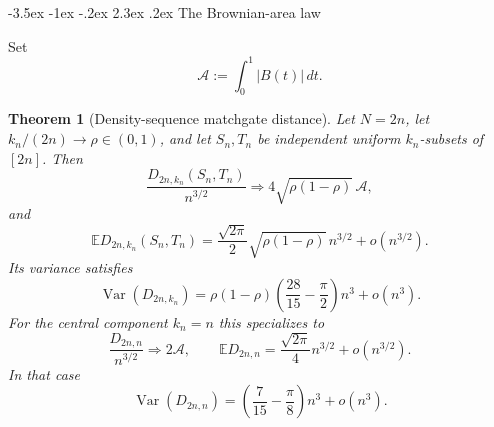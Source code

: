 \documentclass[twoside,10pt]{article}
\makeatletter
\numberwithin{equation}{section}
\theoremstyle{slbody}
\newtheorem{theorem}{Theorem}[section]
\theoremstyle{definition}
\theoremstyle{remark}
\newcommand{\E}{\mathbb{E}}
\newcommand{\Var}{\operatorname{Var}}
\newcommand{\1}{\mathbf{1}}
\renewcommand{\section}{%
  \@startsection{section}{1}{\z@}%
    {-3.5ex \@plus -1ex \@minus -.2ex}%
    {2.3ex \@plus .2ex}%
    {\normalfont\large\bfseries}}
\makeatother
\begin{document}
\section{The Brownian-area law}

Set
\[
 \mathcal A:=\int_0^1|B(t)|\,dt.
\]

\begin{theorem}[Density-sequence matchgate distance]\label{thm:main}
Let $N=2n$, let $k_n/(2n)\to\rho\in(0,1)$, and let $S_n,T_n$ be independent
uniform $k_n$-subsets of $[2n]$.  Then
\begin{equation}\label{eq:distribution-main}
 \frac{D_{2n,k_n}(S_n,T_n)}{n^{3/2}}
 \Rightarrow 4\sqrt{\rho(1-\rho)}\,\mathcal A,
\end{equation}
and
\begin{equation}\label{eq:expectation-main}
 \E D_{2n,k_n}(S_n,T_n)
 =\frac{\sqrt{2\pi}}2\sqrt{\rho(1-\rho)}\,n^{3/2}
   +o(n^{3/2}).
\end{equation}
Its variance satisfies
\begin{equation}\label{eq:variance-main}
 \Var(D_{2n,k_n})
 =\rho(1-\rho)\left(\frac{28}{15}-\frac\pi2\right)n^3
  +o(n^3).
\end{equation}
For the central component $k_n=n$ this specializes to
\begin{equation}\label{eq:central-main}
 \frac{D_{2n,n}}{n^{3/2}}\Rightarrow2\mathcal A,
 \qquad
 \E D_{2n,n}=\frac{\sqrt{2\pi}}4n^{3/2}+o(n^{3/2}).
\end{equation}
In that case
\begin{equation}\label{eq:central-variance}
 \Var(D_{2n,n})
 =\left(\frac7{15}-\frac\pi8\right)n^3+o(n^3).
\end{equation}
\end{theorem}
\end{document}
